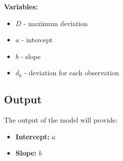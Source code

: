 \documentclass{article}
\begin{document}
\textbf{Variables:}
\begin{itemize}
    \item \(D\) - maximum deviation
    \item \(a\) - intercept
    \item \(b\) - slope
    \item \(d_k\) - deviation for each observation
\end{itemize}

\subsection*{Output}
The output of the model will provide:
\begin{itemize}
    \item \textbf{Intercept:} \(a\)
    \item \textbf{Slope:} \(b\)
\end{itemize}
\end{document}
